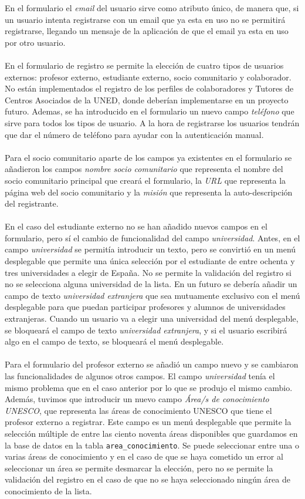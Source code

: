 \documentclass[11pt]{book}
\begin{document}
 En el formulario el \emph{email} del usuario sirve como atributo único, de manera que, si un usuario intenta registrarse con un email que ya esta en uso no se permitirá registrarse, llegando un mensaje de la aplicación de que el email ya esta en uso por otro usuario. \\\\
 En el formulario de registro se permite la elección de cuatro tipos de usuarios externos: profesor externo, estudiante externo, socio comunitario y colaborador. No están implementados el registro de los perfiles de colaboradores y Tutores de Centros Asociados de la UNED, donde deberían implementarse en un proyecto futuro. Ademas, se ha introducido en el formulario un nuevo campo \emph{teléfono} que sirve para todos los tipos de usuario. A la hora de registrarse los usuarios tendrán que dar el número de teléfono para ayudar con la autenticación manual.\\\\
 Para el socio comunitario aparte de los campos ya existentes en el formulario se añadieron los campos \emph{nombre socio comunitario} que representa el nombre del socio comunitario
 principal que creará el formulario, la \emph{URL} que representa la página web del socio comunitario y la \emph{misión} que representa la auto-descripción del registrante. \\\\
 En el caso del estudiante externo no se han añadido nuevos campos en el formulario, pero sí el cambio de funcionalidad del campo \emph{universidad}. Antes, en el campo \emph{universidad} se permitía introducir un texto, pero se convirtió en un menú desplegable que permite una única selección por el estudiante de entre ochenta y tres universidades a elegir de España. No se permite la validación del registro si no se selecciona alguna universidad de la lista. En un futuro se debería añadir un campo de texto \emph{universidad extranjera} que sea mutuamente exclusivo con el menú desplegable para que puedan participar profesores y alumnos de universidades extranjeras. Cuando un usuario va a elegir una universidad del menú desplegable, se bloqueará el campo de texto \emph{universidad extranjera}, y si el usuario escribirá algo en el campo de texto, se bloqueará el menú desplegable. \\\\
 Para el formulario del profesor externo se añadió un campo nuevo y se cambiaron las funcionalidades de algunos otros campos. El campo \emph{universidad} tenía el mismo problema que en el caso anterior por lo que se produjo el mismo cambio. Además, tuvimos que introducir un nuevo campo \emph{Área/s de conocimiento UNESCO}, que representa las áreas de conocimiento UNESCO que tiene el profesor externo a registrar. Este campo es un menú desplegable que permite la selección múltiple de entre las ciento noventa áreas disponibles que guardamos en la base de datos en la tabla \texttt{area\_conocimiento}. Se puede seleccionar entre una o varias áreas de conocimiento y en el caso de que se haya cometido un error al seleccionar un área se permite desmarcar la elección, pero no se permite la validación del registro en el caso de que no se haya seleccionado ningún área de conocimiento de la lista.\\\\
\end{document}
